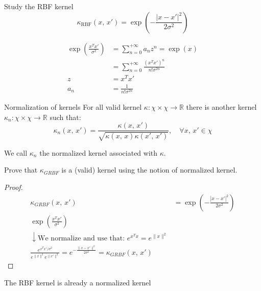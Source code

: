 \begin{exercise}{Study the RBF kernel}{}
	\begin{equation*}
		\kappa_{\text{RBF}}(x,\,x') = \exp\left(-\frac{|x-x'|^2}{2\sigma^2}\right)
	\end{equation*}

	\begin{figure}[H]
	\end{figure}

	\tcblower
	\begin{align*}
		\exp\left(
		\frac{x^Tx'}{\sigma^2}
		\right)
		    & = \sum_{n=0}^{+\infty} a_n z^n = \exp(x)               \\
		    & = \sum_{n=0}^{+\infty} \frac{(x^Tx')^n}{n!\sigma^{2n}} \\[0.5em]
		z   & = x^Tx'                                                \\
		a_n & = \frac{1}{n!\sigma^{2n}}
	\end{align*}
\end{exercise}

\begin{definition}{Normalization of kernels}{}
	For all valid kernel $\kappa : \chi \times \chi \to \mathds R$
	there is another kernel $\kappa_n : \chi \times \chi \to \mathds R$
	such that:
	\begin{equation*}
		\kappa_n(x,\,x') = \frac{\kappa(x,\,x')}{\sqrt{\kappa(x,\,x)\kappa(x',\,x')}}, \quad \forall x,\,x' \in \chi
	\end{equation*}

	We call $\kappa_n$ the normalized kernel associated with $\kappa$.
\end{definition}

\begin{exercise}{Prove that
		$\kappa_{GRBF}$ is a (valid) kernel using the notion of
		normalized kernel.}{}

	\begin{proof}
		\begin{align*}
			\kappa_{GRBF}(x,\,x') & = \exp\left(-\frac{|x-x'|^2}{2\sigma^2}\right)          \\[1em]
			\exp\left(\frac{x^Tx'}{\sigma^2}\right)   \tag{we know this is a valid kernel}  \\
			\downarrow{} \text{We normalize and use that: } e^{x^Tx} = e^{\lVert x\rVert^2} \\
			\frac{e^{x^Tx'/\sigma^2}}{
				e^{\lVert x\rVert^2}
				e^{\lVert x'\rVert^2}
			} = e^{-\frac{\lVert x-x'\rVert^2}{2\sigma^2}} = \kappa_{GRBF}(x,\,x')
		\end{align*}
	\end{proof}

	\begin{note}
		The RBF kernel is already a normalized kernel
	\end{note}
\end{exercise}

